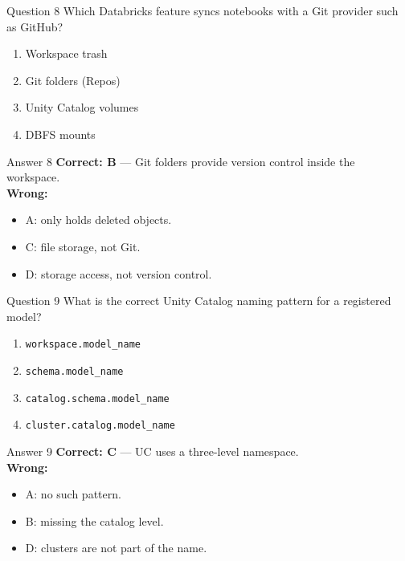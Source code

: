 \documentclass[aspectratio=169,11pt]{beamer}
\begin{document}
	\begin{frame}{Question 8}
		Which Databricks feature syncs notebooks with a Git provider such as GitHub?
		\begin{enumerate}[label=\Alph*.]
			\item Workspace trash
			\item Git folders (Repos)
			\item Unity Catalog volumes
			\item DBFS mounts
		\end{enumerate}
	\end{frame}
	\begin{frame}{Answer 8}
		\textbf{Correct: B} --- Git folders provide version control inside the workspace.\\
		\vspace{0.5em}
		\textbf{Wrong:}
		\begin{itemize}
			\item A: only holds deleted objects.
			\item C: file storage, not Git.
			\item D: storage access, not version control.
		\end{itemize}
	\end{frame}
	
	\begin{frame}{Question 9}
		What is the correct Unity Catalog naming pattern for a registered model?
		\begin{enumerate}[label=\Alph*.]
			\item \texttt{workspace.model\_name}
			\item \texttt{schema.model\_name}
			\item \texttt{catalog.schema.model\_name}
			\item \texttt{cluster.catalog.model\_name}
		\end{enumerate}
	\end{frame}
	\begin{frame}{Answer 9}
		\textbf{Correct: C} --- UC uses a three-level namespace.\\
		\vspace{0.5em}
		\textbf{Wrong:}
		\begin{itemize}
			\item A: no such pattern.
			\item B: missing the catalog level.
			\item D: clusters are not part of the name.
		\end{itemize}
	\end{frame}
	
\end{document}
